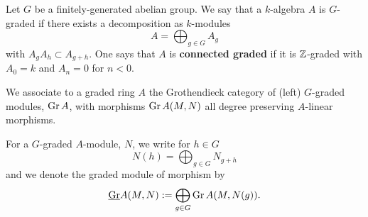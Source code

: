 \begin{definition}
  Let \(G\) be a finitely-generated abelian group. We say that a \(k\)-algebra \(A\) is \(G\)-graded if there exists a decomposition as \(k\)-modules 
  \begin{displaymath}
    A = \bigoplus_{g \in G} A_g
  \end{displaymath}
  with \(A_g A_h \subset A_{g+h}\). One says that \(A\) is \textbf{connected graded} if it is \(\mathbb{Z}\)-graded with \(A_0 = k\) and \(A_n = 0\) for \(n < 0\). 
\end{definition}




\begin{definition}
  We associate to a graded ring \(A\) the Grothendieck category of (left) \(G\)-graded modules, \(\operatorname{Gr}A\), with morphisms \(\operatorname{Gr}A(M,N)\) all degree preserving \(A\)-linear morphisms.

  For a \(G\)-graded \(A\)-module, \(N\), we write for \(h \in G\)
  \[N(h) = \bigoplus_{g \in G} N_{g + h}\]
  and we denote the graded module of morphism by
  \[\underline{\operatorname{Gr}}A(M,N) := \bigoplus_{g \in G} \operatorname{Gr}A(M,N(g)).\]
\end{definition}

